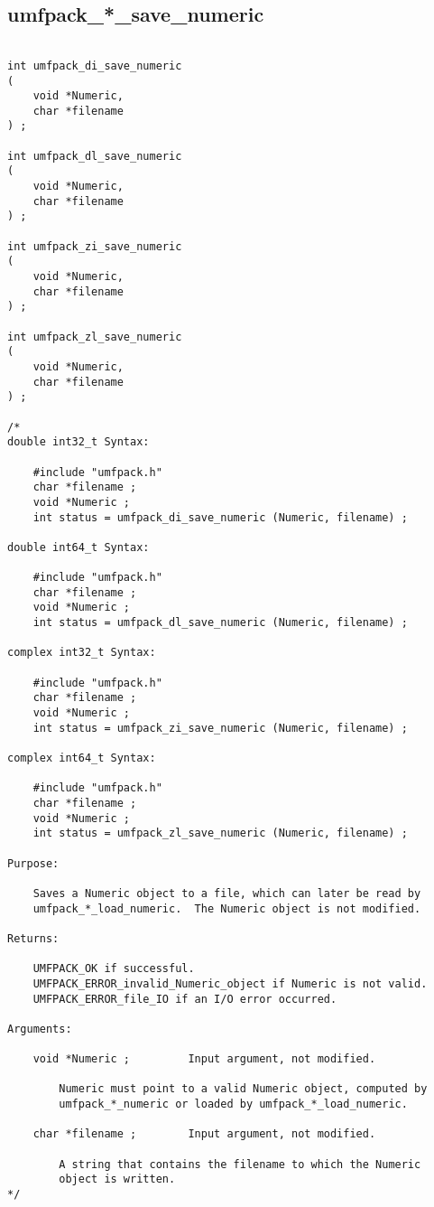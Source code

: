 \documentclass[11pt]{article}
\begin{document}
\newpage
\subsection{umfpack\_*\_save\_numeric}

{\footnotesize
\begin{verbatim}

int umfpack_di_save_numeric
(
    void *Numeric,
    char *filename
) ;

int umfpack_dl_save_numeric
(
    void *Numeric,
    char *filename
) ;

int umfpack_zi_save_numeric
(
    void *Numeric,
    char *filename
) ;

int umfpack_zl_save_numeric
(
    void *Numeric,
    char *filename
) ;

/*
double int32_t Syntax:

    #include "umfpack.h"
    char *filename ;
    void *Numeric ;
    int status = umfpack_di_save_numeric (Numeric, filename) ;

double int64_t Syntax:

    #include "umfpack.h"
    char *filename ;
    void *Numeric ;
    int status = umfpack_dl_save_numeric (Numeric, filename) ;

complex int32_t Syntax:

    #include "umfpack.h"
    char *filename ;
    void *Numeric ;
    int status = umfpack_zi_save_numeric (Numeric, filename) ;

complex int64_t Syntax:

    #include "umfpack.h"
    char *filename ;
    void *Numeric ;
    int status = umfpack_zl_save_numeric (Numeric, filename) ;

Purpose:

    Saves a Numeric object to a file, which can later be read by
    umfpack_*_load_numeric.  The Numeric object is not modified.

Returns:

    UMFPACK_OK if successful.
    UMFPACK_ERROR_invalid_Numeric_object if Numeric is not valid.
    UMFPACK_ERROR_file_IO if an I/O error occurred.

Arguments:

    void *Numeric ;         Input argument, not modified.

        Numeric must point to a valid Numeric object, computed by
        umfpack_*_numeric or loaded by umfpack_*_load_numeric.

    char *filename ;        Input argument, not modified.

        A string that contains the filename to which the Numeric
        object is written.
*/
\end{verbatim}
}
\end{document}
